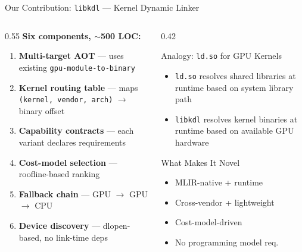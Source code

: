 \documentclass[aspectratio=169,10pt]{beamer}
\begin{document}
\begin{frame}{Our Contribution: \texttt{libkdl} --- Kernel Dynamic Linker}
  \begin{columns}[T]
    \begin{column}{0.55\textwidth}
      \textbf{Six components, $\sim$500 LOC:}
      \begin{enumerate}
        \item \textbf{Multi-target AOT} --- uses existing \texttt{gpu-module-to-binary}
        \item \textbf{Kernel routing table} --- maps \texttt{(kernel, vendor, arch)} $\to$ binary offset
        \item \textbf{Capability contracts} --- each variant declares requirements
        \item \textbf{Cost-model selection} --- roofline-based ranking
        \item \textbf{Fallback chain} --- GPU $\to$ GPU $\to$ CPU
        \item \textbf{Device discovery} --- dlopen-based, no link-time deps
      \end{enumerate}
    \end{column}
    \begin{column}{0.42\textwidth}
      \begin{exampleblock}{Analogy: \texttt{ld.so} for GPU Kernels}
        \begin{itemize}
          \item \texttt{ld.so} resolves shared libraries at runtime based on system library path
          \item \texttt{libkdl} resolves kernel binaries at runtime based on available GPU hardware
        \end{itemize}
      \end{exampleblock}
      \vspace{0.3em}
      \begin{block}{What Makes It Novel}
        \begin{itemize}
          \item MLIR-native + runtime
          \item Cross-vendor + lightweight
          \item Cost-model-driven
          \item No programming model req.
        \end{itemize}
      \end{block}
    \end{column}
  \end{columns}
\end{frame}
\end{document}
